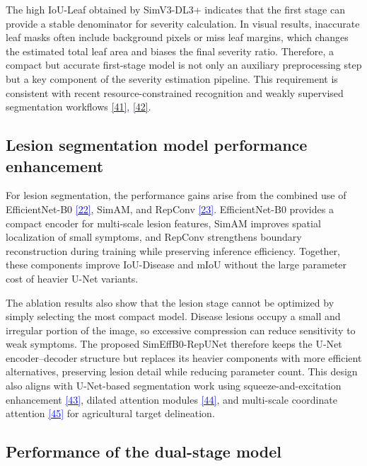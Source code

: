 \documentclass[
]{article}
\begin{document}
The high IoU-Leaf obtained by SimV3-DL3+ indicates that the first stage
can provide a stable denominator for severity calculation. In visual
results, inaccurate leaf masks often include background pixels or miss
leaf margins, which changes the estimated total leaf area and biases the
final severity ratio. Therefore, a compact but accurate first-stage model
is not only an auxiliary preprocessing step but a key component of the
severity estimation pipeline. This requirement is consistent with recent
resource-constrained recognition and weakly supervised segmentation
workflows \textcolor{blue}{\hyperlink{ref:41}{[41]}, \hyperlink{ref:42}{[42]}}.

\hypertarget{lesion-segmentation-model-performance-enhancement}{%
\subsection{Lesion segmentation model performance
enhancement}\label{lesion-segmentation-model-performance-enhancement}}

For lesion segmentation, the performance gains arise from the combined
use of EfficientNet-B0 \hyperlink{ref:22}{\textcolor{blue}{[22]}}, SimAM,
and RepConv \hyperlink{ref:23}{\textcolor{blue}{[23]}}. EfficientNet-B0
provides a compact encoder for multi-scale lesion features, SimAM
improves spatial localization of small symptoms, and RepConv strengthens
boundary reconstruction during training while preserving inference
efficiency. Together, these components improve IoU-Disease and mIoU
without the large parameter cost of heavier U-Net variants.

The ablation results also show that the lesion stage cannot be optimized
by simply selecting the most compact model. Disease lesions occupy a
small and irregular portion of the image, so excessive compression can
reduce sensitivity to weak symptoms. The proposed SimEffB0-RepUNet
therefore keeps the U-Net encoder--decoder structure but replaces its
heavier components with more efficient alternatives, preserving lesion
detail while reducing parameter count. This design also aligns with
U-Net-based segmentation work using squeeze-and-excitation enhancement
\hyperlink{ref:43}{\textcolor{blue}{[43]}}, dilated attention modules
\hyperlink{ref:44}{\textcolor{blue}{[44]}}, and multi-scale coordinate
attention \hyperlink{ref:45}{\textcolor{blue}{[45]}} for agricultural target
delineation.

\hypertarget{performance-of-the-dual-stage-model}{%
\subsection{Performance of the dual-stage
model}\label{performance-of-the-dual-stage-model}}
\end{document}

